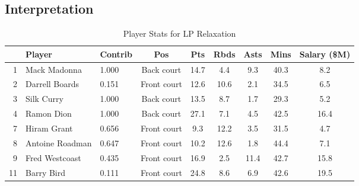 \documentclass[a4paper,11pt]{article}
\begin{document}
\subsection{Interpretation}
\begin{table}[h!]
    \centering
    \begin{tabular}{rllcccccc}
        \hline
        & \textbf{Player} & \textbf{Contrib} & \textbf{Pos} & \textbf{Pts} & \textbf{Rbds} & \textbf{Asts} & \textbf{Mins} & \textbf{Salary (\$M)} \\
        \hline
        1  & Mack Madonna    & 1.000                 & Back court        & 14.7            & 4.4               & 9.3              & 40.3             & 8.2                   \\
        2  & Darrell Boards  & 0.151                 & Front court       & 12.6            & 10.6              & 2.1              & 34.5             & 6.5                   \\
        3  & Silk Curry      & 1.000                 & Back court        & 13.5            & 8.7               & 1.7              & 29.3             & 5.2                   \\
        4  & Ramon Dion      & 1.000                 & Back court        & 27.1            & 7.1               & 4.5              & 42.5             & 16.4                  \\
        7  & Hiram Grant     & 0.656                 & Front court       & 9.3             & 12.2              & 3.5              & 31.5             & 4.7                   \\
        8  & Antoine Roadman & 0.647                 & Front court       & 10.2            & 12.6              & 1.8              & 44.4             & 7.1                   \\
        9  & Fred Westcoast  & 0.435                 & Front court       & 16.9            & 2.5               & 11.4             & 42.7             & 15.8                  \\
        11 & Barry Bird      & 0.111                 & Front court       & 24.8            & 8.6               & 6.9              & 42.6             & 19.5                  \\
        \hline
    \end{tabular}
    \caption{Player Stats for LP Relaxation}
    \label{tab:selected_players_LP}
\end{table}
\end{document}
